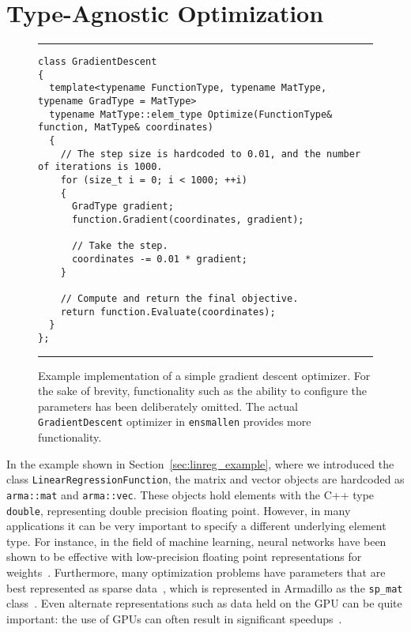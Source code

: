 \section{Type-Agnostic Optimization}
\label{sec:templated_optimize}


\begin{figure}[b!]
\hrule
\vspace{1ex}
\begin{verbatim}
class GradientDescent
{
  template<typename FunctionType, typename MatType, typename GradType = MatType>
  typename MatType::elem_type Optimize(FunctionType& function, MatType& coordinates)
  {
    // The step size is hardcoded to 0.01, and the number of iterations is 1000.
    for (size_t i = 0; i < 1000; ++i)
    {
      GradType gradient;
      function.Gradient(coordinates, gradient);

      // Take the step.
      coordinates -= 0.01 * gradient;
    }

    // Compute and return the final objective.
    return function.Evaluate(coordinates);
  }
};
\end{verbatim}
\hrule
\vspace*{-0.5em}
\caption{Example implementation of a simple gradient descent optimizer.
For the sake of brevity, functionality such as the ability to configure the parameters has
been deliberately omitted.
The actual {\tt GradientDescent} optimizer in {\tt ensmallen} provides more functionality.
}

\label{fig:gd}
\end{figure}

In the example shown in Section~\ref{sec:linreg_example},
where we introduced the class {\tt LinearRegressionFunction},
the matrix and vector objects are hardcoded as {\tt arma::mat} and {\tt arma::vec}.
These objects hold elements with the C++ type {\tt double},
representing double precision floating point.
However, in many applications it can be very important to specify a different
underlying element type.  For instance, in the field of machine learning, neural
networks have been shown to be effective with low-precision floating point
representations for weights~\cite{vanhoucke2011improving}.
Furthermore, many optimization problems have parameters
that are best represented as sparse data~\cite{van2011sparse, recht2011hogwild},
which is represented in Armadillo as the {\tt sp\_mat} class~\cite{sanderson2018user, mca24030070}.
Even alternate representations such as data held on the GPU can be quite
important: the use of GPUs can often result in significant
speedups~\cite{oh2004gpu, athanasopoulos2011gpu}.

